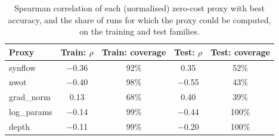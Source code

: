 \begin{table}[!htbp]
\centering
\small
\caption{Spearman correlation of each (normalised) zero-cost proxy with best accuracy, and the share of runs for which the proxy could be computed, on the training and test families.}
\label{tab:proxy-transfer}
\begin{tabular}{lcccc}
\toprule
Proxy & Train: $\rho$ & Train: coverage & Test: $\rho$ & Test: coverage \\
\midrule
synflow & $-$0.36 & 92\% & 0.35 & 52\% \\
nwot & $-$0.40 & 98\% & $-$0.55 & 43\% \\
grad\_norm & 0.13 & 68\% & 0.40 & 39\% \\
log\_params & $-$0.14 & 99\% & $-$0.44 & 100\% \\
depth & $-$0.11 & 99\% & $-$0.20 & 100\% \\
\bottomrule
\end{tabular}
\end{table}
